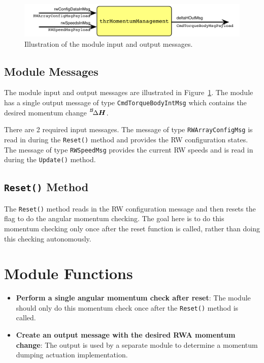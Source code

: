 \documentclass[]{BasiliskReportMemo}
\begin{document}
\begin{figure}[h]
	\centerline{
		\includegraphics{Figures/moduleImg}
	}
	\caption{Illustration of the module input and output messages.}
	\label{fig:moduleImg}
\end{figure}





\subsection{Module Messages}
The module input and output messages are illustrated in Figure~\ref{fig:moduleImg}.  The module has a single output message of type {\tt CmdTorqueBodyIntMsg} which contains the desired momentum change $\leftexp{B}{\Delta}\bm H$.  

There are 2 required input messages.  The message of type {\tt RWArrayConfigMsg} is read in during the {\tt Reset()} method and provides the RW configuration states.  The message of type {\tt RWSpeedMsg} provides the current RW speeds and is read in during the {\tt Update()} method.

\subsection{{\tt Reset()} Method}
The {\tt Reset()} method reads in the RW configuration message and then resets the flag to do the angular momentum checking.  The goal here is to do this momentum checking only once after the reset function is called, rather than doing this checking autonomously.  









\section{Module Functions}
\begin{itemize}
	\item \textbf{Perform a single angular momentum check after reset}: The module should only do this momentum check once after the {\tt Reset()} method is called.
	\item \textbf{Create an output message with the desired RWA momentum change}: The output is used by a separate module to determine a momentum dumping actuation implementation.  
\end{itemize}
\end{document}
